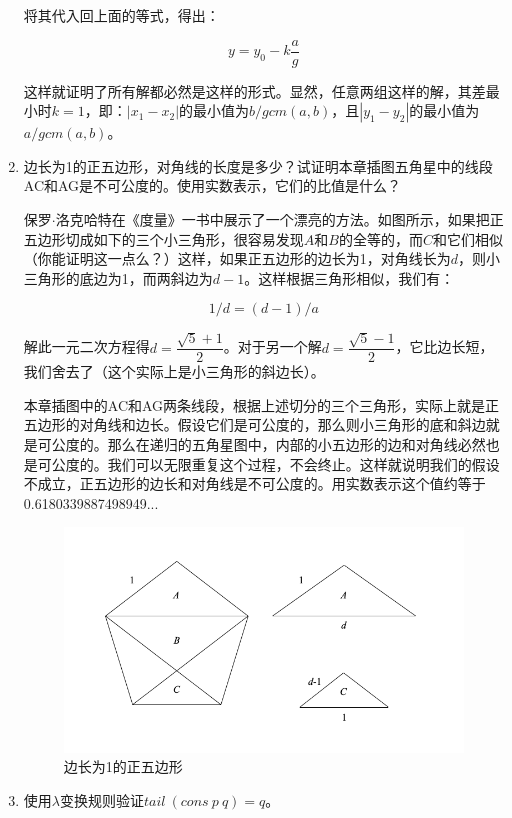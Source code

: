 \documentclass[UTF8]{article}
\begin{document}
\begin{enumerate}
将其代入回上面的等式，得出：

\[
y = y_0 - k \dfrac{a}{g}
\]

这样就证明了所有解都必然是这样的形式。显然，任意两组这样的解，其差最小时$k = 1$，即：$|x_1 - x_2|$的最小值为$b/gcm(a, b)$，且$|y_1 - y_2|$的最小值为$a/gcm(a, b)$。

\item 边长为1的正五边形，对角线的长度是多少？试证明本章插图五角星中的线段AC和AG是不可公度的。使用实数表示，它们的比值是什么？

保罗$\cdot$洛克哈特在《度量》一书中\cite{Lockhart2012}展示了一个漂亮的方法。如图所示，如果把正五边形切成如下的三个小三角形，很容易发现$A$和$B$的全等的，而$C$和它们相似（你能证明这一点么？）这样，如果正五边形的边长为1，对角线长为$d$，则小三角形的底边为1，而两斜边为$d - 1$。这样根据三角形相似，我们有：

\[
  1 / d = (d - 1) / a
\]

解此一元二次方程得$d = \dfrac{\sqrt{5} + 1}{2}$。对于另一个解$d = \dfrac{\sqrt{5} - 1}{2}$，它比边长短，我们舍去了（这个实际上是小三角形的斜边长）。

本章插图中的AC和AG两条线段，根据上述切分的三个三角形，实际上就是正五边形的对角线和边长。假设它们是可公度的，那么则小三角形的底和斜边就是可公度的。那么在递归的五角星图中，内部的小五边形的边和对角线必然也是可公度的。我们可以无限重复这个过程，不会终止。这样就说明我们的假设不成立，正五边形的边长和对角线是不可公度的。用实数表示这个值约等于0.6180339887498949...

\begin{figure}[htbp]
 \centering
 \includegraphics[scale=0.4]{img/pentagram-unit.png}
 \captionsetup{labelformat=empty}
 \caption{边长为1的正五边形}
 \label{fig:pentagram-unit}
\end{figure}

\item 使用$\lambda$变换规则验证$tail\ (cons\ p\ q) = q$。


\end{enumerate}
\end{document}
